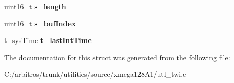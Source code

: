 \begin{DoxyCompactItemize}
\item 
\hypertarget{structtwi_chan_hndl_abe5571eb3ee1bfd90b08ef48f570a180}{uint16\-\_\-t {\bfseries s\-\_\-length}}\label{structtwi_chan_hndl_abe5571eb3ee1bfd90b08ef48f570a180}

\item 
\hypertarget{structtwi_chan_hndl_a047ca5f6b87f39d833c25140f604e650}{uint16\-\_\-t {\bfseries s\-\_\-buf\-Index}}\label{structtwi_chan_hndl_a047ca5f6b87f39d833c25140f604e650}

\item 
\hypertarget{structtwi_chan_hndl_aaa9a5469ba00ace4f9c567d84f0d139a}{\hyperlink{structt__sys_time}{t\-\_\-sys\-Time} {\bfseries t\-\_\-last\-Int\-Time}}\label{structtwi_chan_hndl_aaa9a5469ba00ace4f9c567d84f0d139a}

\end{DoxyCompactItemize}


The documentation for this struct was generated from the following file\-:\begin{DoxyCompactItemize}
\item 
C\-:/arbitros/trunk/utilities/source/xmega128\-A1/utl\-\_\-twi.\-c\end{DoxyCompactItemize}
